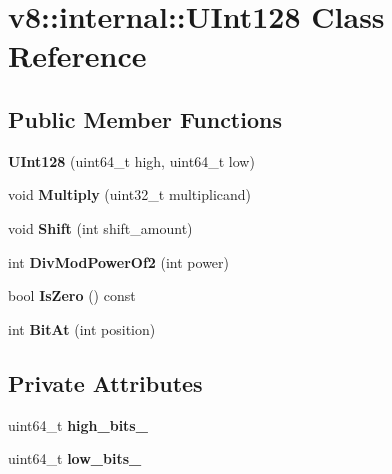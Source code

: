 \hypertarget{classv8_1_1internal_1_1_u_int128}{}\section{v8\+:\+:internal\+:\+:U\+Int128 Class Reference}
\label{classv8_1_1internal_1_1_u_int128}
\subsection*{Public Member Functions}
\begin{DoxyCompactItemize}
\item 
{\bfseries U\+Int128} (uint64\+\_\+t high, uint64\+\_\+t low)\hypertarget{classv8_1_1internal_1_1_u_int128_afe2e8e25543ca2fa36bf4bfbb70036f9}{}\label{classv8_1_1internal_1_1_u_int128_afe2e8e25543ca2fa36bf4bfbb70036f9}

\item 
void {\bfseries Multiply} (uint32\+\_\+t multiplicand)\hypertarget{classv8_1_1internal_1_1_u_int128_aac3862710a8cd4c8b806ae8f6e2d0e2b}{}\label{classv8_1_1internal_1_1_u_int128_aac3862710a8cd4c8b806ae8f6e2d0e2b}

\item 
void {\bfseries Shift} (int shift\+\_\+amount)\hypertarget{classv8_1_1internal_1_1_u_int128_ab99d0359de762cf7742b74c91b30f54f}{}\label{classv8_1_1internal_1_1_u_int128_ab99d0359de762cf7742b74c91b30f54f}

\item 
int {\bfseries Div\+Mod\+Power\+Of2} (int power)\hypertarget{classv8_1_1internal_1_1_u_int128_abd135199bd3e858d47182f6187a38723}{}\label{classv8_1_1internal_1_1_u_int128_abd135199bd3e858d47182f6187a38723}

\item 
bool {\bfseries Is\+Zero} () const \hypertarget{classv8_1_1internal_1_1_u_int128_a19d67a1727368dccf4e3d74601e0b547}{}\label{classv8_1_1internal_1_1_u_int128_a19d67a1727368dccf4e3d74601e0b547}

\item 
int {\bfseries Bit\+At} (int position)\hypertarget{classv8_1_1internal_1_1_u_int128_a648274c78f41bb8e940d5fc0fd54be25}{}\label{classv8_1_1internal_1_1_u_int128_a648274c78f41bb8e940d5fc0fd54be25}

\end{DoxyCompactItemize}
\subsection*{Private Attributes}
\begin{DoxyCompactItemize}
\item 
uint64\+\_\+t {\bfseries high\+\_\+bits\+\_\+}\hypertarget{classv8_1_1internal_1_1_u_int128_a9f0d8cef084eec94767e75b1c7a18122}{}\label{classv8_1_1internal_1_1_u_int128_a9f0d8cef084eec94767e75b1c7a18122}

\item 
uint64\+\_\+t {\bfseries low\+\_\+bits\+\_\+}\hypertarget{classv8_1_1internal_1_1_u_int128_a27750f70f5a9c609a96f97c3710bf7b8}{}\label{classv8_1_1internal_1_1_u_int128_a27750f70f5a9c609a96f97c3710bf7b8}

\end{DoxyCompactItemize}
